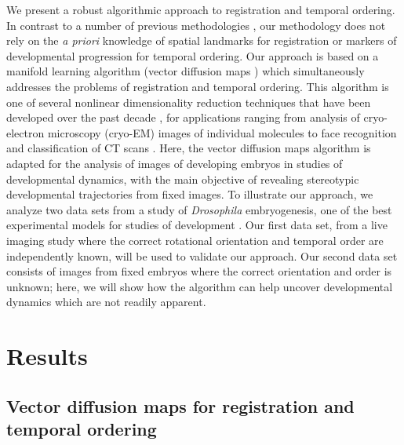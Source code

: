 \documentclass[twocolumn, 10pt]{article}
\begin{document}
We present a robust algorithmic approach to registration and temporal ordering.
%
In contrast to a number of previous methodologies \citep{zitova2003image, rowley1998rotation, hajnal2010medical, greenspan1994rotation, zhao2003face}, our methodology does not rely on the {\em a priori} knowledge of spatial landmarks for registration or markers of developmental progression for temporal ordering.
%
Our approach is based on a manifold learning algorithm (vector diffusion maps \citep{singer2012vector}) which simultaneously addresses the problems of registration and temporal ordering. 
%
This algorithm is one of several nonlinear dimensionality reduction techniques that have been developed over the past decade \citep{Belkin2003, coifman2005geometric, coifman2006geometric, tenenbaum2000global, roweis2000nonlinear}, for
applications ranging from analysis of cryo-electron microscopy (cryo-EM) images of individual molecules  \citep{zhao2014rotationally, singer2011viewing} to face recognition \citep{lafon2006data} and classification of CT scans \citep{fernandez2014diffusion}.
%
Here, the vector diffusion maps algorithm is adapted for the analysis of images of developing embryos in studies of developmental dynamics, with the main objective of revealing stereotypic developmental trajectories from fixed images.
%
To illustrate our approach, we analyze two data sets from a study of {\it Drosophila} embryogenesis, one of the best experimental models for studies of development \citep{jaeger2012drosophila}.
%
Our first data set, from a live imaging study where the correct rotational orientation and temporal order are independently known, will be used to validate our approach.
%
Our second data set consists of images from fixed embryos where the correct orientation and order is unknown; here, we will show how the algorithm can help uncover developmental dynamics which are not readily apparent. 


\section*{Results}

\subsection*{Vector diffusion maps for registration and temporal ordering}
\end{document}
